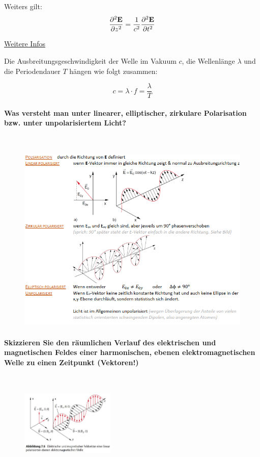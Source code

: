 \documentclass[a4paper, 11pt, ngerman, parskip=half-]{scrartcl}
\begin{document}
Weiters gilt:
\[\pdv[order={2}]{\vb{E}}{z} = \frac{1}{c^2} \pdv[order={2}]{\vb{E}}{t}\]


\begin{center}
    \href{https://de.universaldenker.org/lektionen/281}{\underline{Weitere Infos}}
\end{center}


Die Ausbreitungsgeschwindigkeit der Welle im Vakuum $c$, die Wellenlänge $\lambda$ und die Periodendauer $T$ hängen wie folgt zusammen:

\begin{equation}
    c = \lambda \cdot f = \frac{\lambda}{T}
\end{equation}
\paragraph{Was versteht man unter linearer, elliptischer, zirkulare Polarisation bzw. unter
    unpolarisiertem Licht?} ~

\begin{figure}[H]
    \centering
    \includegraphics[width=14cm]{image/13/3.png}
\end{figure}

\paragraph{Skizzieren Sie den räumlichen Verlauf des elektrischen und magnetischen Feldes einer
    harmonischen, ebenen elektromagnetischen Welle zu einen Zeitpunkt (Vektoren!)} ~

\begin{figure}[H]
    \centering
    \includegraphics[width=0.4\textwidth]{image/13/4.png}
\end{figure}
\end{document}
